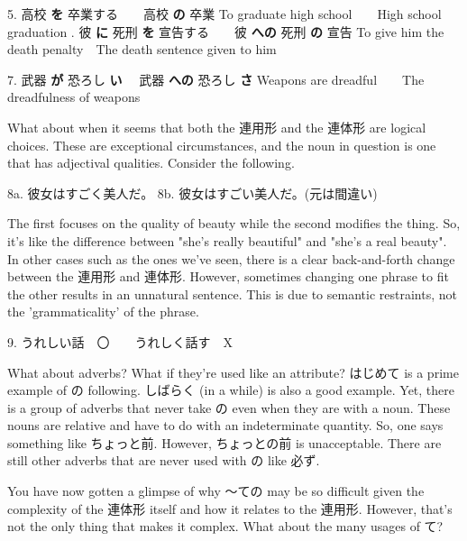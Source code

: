 \par{5. 高校 \textbf{を }卒業する　\textrightarrow 　高校 \textbf{の }卒業  \hfill\break
To graduate high school　\textrightarrow 　High school graduation \hfill\break
\hfill{}. 彼 \textbf{に }死刑 \textbf{を }宣告する　\textrightarrow 　彼 \textbf{への }死刑 \textbf{の }宣告  \hfill\break
To give him the death penalty　\textrightarrow  The death sentence given to him }

\par{7. 武器 \textbf{が }恐ろし \textbf{い }\textrightarrow 　武器 \textbf{への }恐ろし \textbf{さ }\hfill\break
Weapons are dreadful　\textrightarrow 　The dreadfulness of weapons }

\par{  What about when it seems that both the 連用形 and the 連体形 are logical choices. These are exceptional circumstances, and the noun in question is one that has adjectival qualities. Consider the following. }

\par{8a. 彼女はすごく美人だ。 \hfill\break
8b. 彼女はすごい美人だ。(元は間違い) }

\par{ The first focuses on the quality of beauty while the second modifies the thing. So, it's like the difference between "she's really beautiful" and "she's a real beauty". In other cases such as the ones we've seen, there is a clear back-and-forth change between the 連用形 and 連体形. However, sometimes changing one phrase to fit the other results in an unnatural sentence. This is due to semantic restraints, not the 'grammaticality' of the phrase. }

\par{9. うれしい話　〇　\textrightarrow 　うれしく話す　X   }

\par{ What about adverbs? What if they're used like an attribute? はじめて is a prime example of の following. しばらく (in a while) is also a good example. Yet, there is a group of adverbs that never take の even when they are with a noun. These nouns are relative and have to do with an indeterminate quantity. So, one says something like ちょっと前. However, ちょっとの前 is unacceptable. There are still other adverbs that are never used with の like 必ず. }

\par{ You have now gotten a glimpse of why ～ての may be so difficult given the complexity of the 連体形 itself and how it relates to the 連用形. However, that's not the only thing that makes it complex. What about the many usages of て? }


